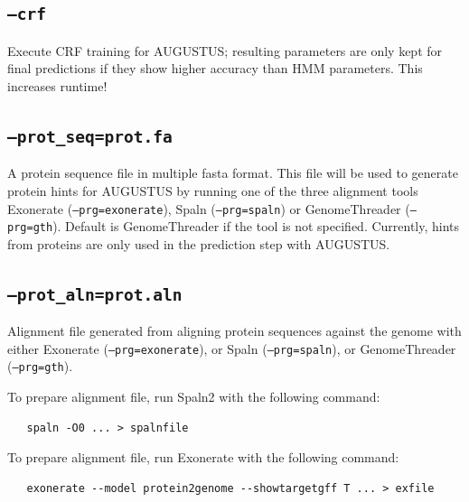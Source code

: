 \documentclass[a4paper,10pt]{report}
\begin{document}
    \subsection{\texttt{--crf}}                                Execute CRF training for AUGUSTUS; resulting parameters are only kept for
                                         final predictions if they show higher accuracy than HMM parameters. This increases runtime!
    \subsection{\texttt{--prot\_seq=prot.fa}}                   A protein sequence file in multiple fasta format. This file will be used
                                         to generate protein hints for AUGUSTUS by running one of the three
                                         alignment tools Exonerate (\texttt{--prg=exonerate}), Spaln (\texttt{--prg=spaln}) or 
                                         GenomeThreader (\texttt{--prg=gth}). Default is GenomeThreader if the tool is not 
                                         specified.
                                         Currently, hints from proteins are only used in the prediction step with
                                         AUGUSTUS. 
    \subsection{\texttt{--prot\_aln=prot.aln}}                  Alignment file generated from aligning protein sequences against the 
                                         genome with either Exonerate (\texttt{--prg=exonerate}), or Spaln (\texttt{--prg=spaln}), or
                                         GenomeThreader (\texttt{--prg=gth}).
                                         
                                         To prepare alignment file, run Spaln2 with the following command:
                                         
                                         \begin{verbatim}
   spaln -O0 ... > spalnfile
                                            \end{verbatim}
                                            
                                         To prepare alignment file, run Exonerate with the following command:
                                         
                                         \begin{verbatim}
   exonerate --model protein2genome --showtargetgff T ... > exfile
                                            \end{verbatim}
                                            
\end{document}
